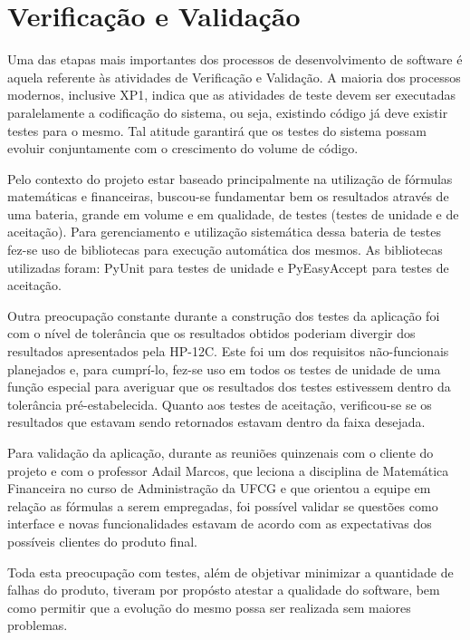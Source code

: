 \chapter{Verificação e Validação}

Uma das etapas mais importantes dos processos de desenvolvimento de software é aquela referente às atividades de Verificação e Validação. A maioria dos processos modernos, inclusive XP1, indica que as atividades de teste devem ser executadas paralelamente a codificação do sistema, ou seja, existindo código já deve existir testes para o mesmo. Tal atitude garantirá que os testes do sistema possam evoluir conjuntamente com o crescimento do volume de código.

Pelo contexto do projeto estar baseado principalmente na utilização de fórmulas matemáticas e financeiras, buscou-se fundamentar bem os resultados através de uma bateria, grande em volume e em qualidade, de testes (testes de unidade e de aceitação). Para gerenciamento e utilização sistemática dessa bateria de testes fez-se uso de bibliotecas para execução automática dos mesmos. As bibliotecas utilizadas foram: PyUnit para testes de unidade e PyEasyAccept para testes de aceitação.

Outra preocupação constante durante a construção dos testes da aplicação foi com o nível de tolerância que os resultados obtidos poderiam divergir dos resultados apresentados pela HP-12C. Este foi um dos requisitos não-funcionais planejados e, para cumprí-lo, fez-se uso em todos os testes de unidade de uma função especial para averiguar que os resultados dos testes estivessem dentro da tolerância pré-estabelecida. Quanto aos testes de aceitação, verificou-se se os resultados que estavam sendo retornados estavam dentro da faixa desejada.

Para validação da aplicação, durante as reuniões quinzenais com o cliente do projeto e com o professor Adail Marcos, que leciona a disciplina de Matemática Financeira no curso de Administração da UFCG e que orientou a equipe em relação as fórmulas a serem empregadas, foi possível validar se questões como interface e novas funcionalidades estavam de acordo com as expectativas dos possíveis clientes do produto final.

Toda esta preocupação com testes, além de objetivar minimizar a quantidade de falhas do produto, tiveram por propósto atestar a qualidade do software, bem como permitir que a evolução do mesmo possa ser realizada sem maiores problemas.

